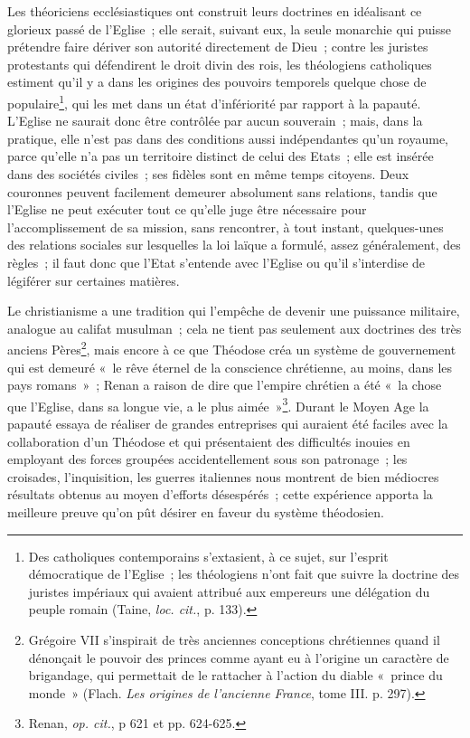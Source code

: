 \documentclass[french,twoside]{book} %
\begin{document}
 Les théoriciens ecclésiastiques ont construit leurs doctrines en idéalisant ce glorieux passé de l’Eglise ; elle serait, suivant eux, la seule monarchie qui puisse prétendre faire dériver son autorité directement de Dieu ; contre les juristes protestants qui défendirent le droit divin des rois, les théologiens catholiques estiment qu’il y a dans les origines des pouvoirs temporels quelque chose de populaire\footnote{ \noindent Des catholiques contemporains s’extasient, à ce sujet, sur l’esprit démocratique de l’Eglise ; les théologiens n’ont fait que suivre la doctrine des juristes impériaux qui avaient attribué aux empereurs une délégation du peuple romain (Taine, \emph{loc. cit.}, p. 133).
 }, qui les met dans un état d’infériorité par rapport à la papauté. L’Eglise ne saurait donc être contrôlée par aucun souverain ; mais, dans la pratique, elle n’est pas dans des conditions aussi indépendantes qu’un royaume, parce qu’elle n’a pas un territoire distinct de celui des Etats ; elle est insérée dans des sociétés civiles ; ses fidèles sont en même temps citoyens. Deux couronnes peuvent facilement demeurer absolument sans relations, tandis que l’Eglise ne peut exécuter tout ce qu’elle juge être nécessaire pour l’accomplissement de sa mission, sans rencontrer, à tout instant, quelques-unes des relations sociales sur lesquelles la loi laïque a formulé, assez généralement, des règles ; il faut donc que l’Etat s’entende avec l’Eglise ou qu’il s’interdise de légiférer sur certaines matières.\par
Le christianisme a une tradition qui l’empêche de devenir  une puissance militaire, analogue au califat musulman ; cela ne tient pas seulement aux doctrines des très anciens Pères\footnote{ \noindent Grégoire VII s’inspirait de très anciennes conceptions chrétiennes quand il dénonçait le pouvoir des princes comme ayant eu à l’origine un caractère de brigandage, qui permettait de le rattacher à l’action du diable « prince du monde » (Flach. \emph{Les origines de l’ancienne France}, tome III. p. 297).
 }, mais encore à ce que Théodose créa un système de gouvernement qui est demeuré « le rêve éternel de la conscience chrétienne, au moins, dans les pays romans » ; Renan a raison de dire que l’empire chrétien a été « la chose que l’Eglise, dans sa longue vie, a le plus aimée »\footnote{ \noindent Renan, \emph{op. cit.}, p 621 et pp. 624-625.
 }. Durant le Moyen Age la papauté essaya de réaliser de grandes entreprises qui auraient été faciles avec la collaboration d’un Théodose et qui présentaient des difficultés inouies en employant des forces groupées accidentellement sous son patronage ; les croisades, l’inquisition, les guerres italiennes nous montrent de bien médiocres résultats obtenus au moyen d’efforts désespérés ; cette expérience apporta la meilleure preuve qu’on pût désirer en faveur du système théodosien.\par
\end{document}
